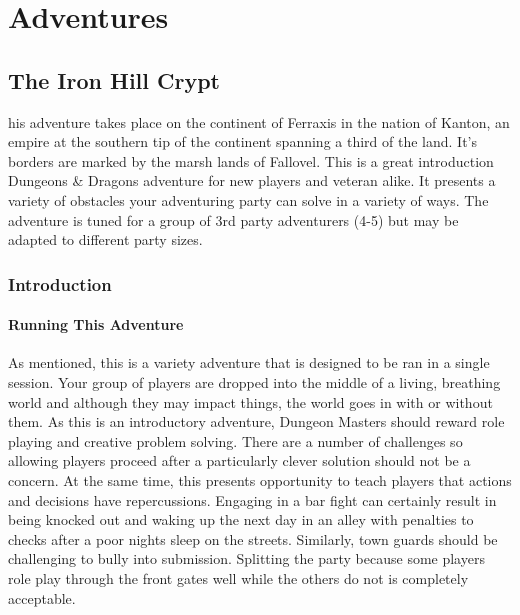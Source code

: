 \documentclass[letterpaper,twocolumn,openany,nodeprecatedcode]{dndbook}
\begin{document}

\part{Adventures}

\chapter{The Iron Hill Crypt}
his adventure takes place on the continent of Ferraxis in the nation of Kanton, an empire at the southern tip of the continent spanning a third of the land. It's borders are marked by the marsh lands of Fallovel. This is a great introduction Dungeons \& Dragons adventure for new players and veteran alike. It presents a variety of obstacles your adventuring party can solve in a variety of ways. The adventure is tuned for a group of 3rd party adventurers (4-5) but may be adapted to different party sizes.

\section{Introduction}%

\subsection{Running This Adventure}
As mentioned, this is a variety adventure that is designed to be ran in a single session. Your group of players are dropped into the middle of a living, breathing world and although they may impact things, the world goes in with or without them. As this is an introductory adventure, Dungeon Masters should reward role playing and creative problem solving. There are a number of challenges so allowing players proceed after a particularly clever solution should not be a concern. At the same time, this presents opportunity to teach players that actions and decisions have repercussions. Engaging in a bar fight can certainly result in being knocked out and waking up the next day in an alley with penalties to checks after a poor nights sleep on the streets. Similarly, town guards should be challenging to bully into submission. Splitting the party because some players role play through the front gates well while the others do not is completely acceptable.
\end{document}
